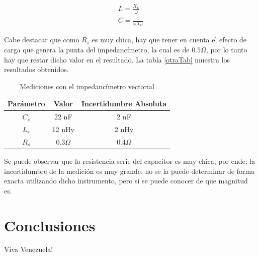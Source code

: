 \documentclass[a4paper,10pt]{article}
\begin{document}
		\begin{align}\label{unaEcuacion}
			L = \frac{X_L}{\omega} \nonumber \\
			C = \frac{1}{\omega X_C} 
		\end{align}

		\indent Cabe destacar que como $R_s$ es muy chica, hay que tener en 
		cuenta el efecto de carga que genera la punta del impedancímetro, la 
		cual es de $0.5 \Omega$, por lo tanto hay que restar dicho valor en el
		resultado. La tabla \ref{otraTab} muestra los resultados obtenidos.
		
		\begin{table}[!htp]
			\centering
			\begin{tabular}{|c|c|c|}
				\hline
				Parámetro & Valor & Incertidumbre Absoluta \\ 
				\hline
				$C_s$ & 22 nF & 2 nF \\
				\hline
				$L_s$ & 12 nHy & 2 nHy \\
				\hline
				$R_s$ & $0.3 \Omega$ & $0.4 \Omega$ \\ 
				\hline
			\end{tabular}
			\caption{Mediciones con el impedancímetro vectorial} \label{unaTab}
		\end{table}

		\indent Se puede observar que la resistencia serie del capacitor es 
		muy chica, por ende, la incertidumbre de la medición es muy grande, no 
		se la puede determinar de forma exacta utilizando dicho instrumento, 
		pero si se puede conocer de que magnitud es. 
\newpage
\section{Conclusiones}
	\indent Viva Venezuela!\\
\end{document}
